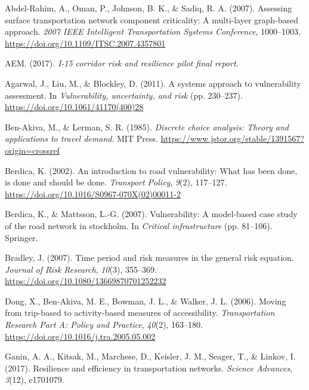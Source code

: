 \documentclass[
  letterpaper,
  number,
  review,
  3p]{elsarticle}
\newlength{\cslhangindent}
\newlength{\cslentryspacingunit} %
\newenvironment{CSLReferences}[2] %
 {%
  \setlength{\parindent}{0pt}
  \ifodd #1
  \let\oldpar\par
  \def\par{\hangindent=\cslhangindent\oldpar}
  \fi
  \setlength{\parskip}{#2\cslentryspacingunit}
 }%
 {}
\begin{document}
\hypertarget{refs}{}
\begin{CSLReferences}{1}{0}
\leavevmode{}%
Abdel-Rahim, A., Oman, P., Johnson, B. K., \& Sadiq, R. A. (2007).
Assessing surface transportation network component criticality: A
multi-layer graph-based approach. \emph{2007 IEEE Intelligent
Transportation Systems Conference}, 1000--1003.
\url{https://doi.org/10.1109/ITSC.2007.4357801}

\leavevmode{}%
AEM. (2017). \emph{I-15 corridor risk and resilience pilot final
report}.

\leavevmode{}%
Agarwal, J., Liu, M., \& Blockley, D. (2011). A systems approach to
vulnerability assessment. In \emph{Vulnerability, uncertainty, and risk}
(pp. 230--237). \url{https://doi.org/10.1061/41170(400)28}

\leavevmode{}%
Ben-Akiva, M., \& Lerman, S. R. (1985). \emph{Discrete choice analysis:
Theory and applications to travel demand}. MIT Press.
\url{https://www.jstor.org/stable/1391567?origin=crossref}

\leavevmode{}%
Berdica, K. (2002). An introduction to road vulnerability: What has been
done, is done and should be done. \emph{Transport Policy}, \emph{9}(2),
117--127. \url{https://doi.org/10.1016/S0967-070X(02)00011-2}

\leavevmode{}%
Berdica, K., \& Mattsson, L.-G. (2007). Vulnerability: A model-based
case study of the road network in stockholm. In \emph{Critical
infrastructure} (pp. 81--106). Springer.

\leavevmode{}%
Bradley, J. (2007). Time period and risk measures in the general risk
equation. \emph{Journal of Risk Research}, \emph{10}(3), 355--369.
\url{https://doi.org/10.1080/13669870701252232}

\leavevmode{}%
Dong, X., Ben-Akiva, M. E., Bowman, J. L., \& Walker, J. L. (2006).
Moving from trip-based to activity-based measures of accessibility.
\emph{Transportation Research Part A: Policy and Practice},
\emph{40}(2), 163--180. \url{https://doi.org/10.1016/j.tra.2005.05.002}

\leavevmode{}%
Ganin, A. A., Kitsak, M., Marchese, D., Keisler, J. M., Seager, T., \&
Linkov, I. (2017). Resilience and efficiency in transportation networks.
\emph{Science Advances}, \emph{3}(12), e1701079.


\end{CSLReferences}
\end{document}
